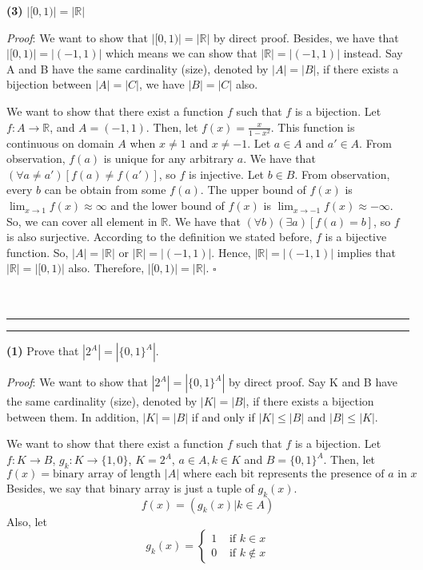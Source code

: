 \documentclass[a4paper, 11pt]{article}
\newcommand{\question}[2] {\vspace{.25in} \hrule\vspace{0.5em}
	\noindent{\bf #1: #2} \vspace{0.5em}
	\hrule \vspace{.10in}}
\renewcommand{\part}[1] {\vspace{.10in} {\bf (#1)}}
\begin{document}
	\part{3} $|[0,1)| = |\mathbb{R}|$

	{\em Proof}: We want to show that $|[0,1)| = |\mathbb{R}|$ by direct proof. Besides, we have that $|[0,1)| = |(-1,1)|$ which means we can show that $|\mathbb{R}| = |(-1,1)|$ instead. Say A and B have the same cardinality (size), denoted by $|A| = |B|$, if there exists a bijection between $|A| = |C|$, we have $|B| = |C|$ also.
	
	We want to show that there exist a function $f$ such that $f$ is a bijection. Let $f: A \rightarrow \mathbb{R}$, and $A = (-1,1)$. Then, let $f(x) = \frac{x}{1-x^2}$. This function is continuous on domain $A$ when $x \neq 1$ and $x \neq -1$. Let $a \in A$ and $a' \in A$. From observation, $f(a)$ is unique for any arbitrary $a$. We have that $ ( \forall a \neq a')[ f(a) \neq f(a')]$, so $f$ is injective. Let $b \in B$. From observation, every $b$ can be obtain from some $f(a)$. The upper bound of $f(x)$ is $\lim_{x \rightarrow 1} f(x) \approx \infty$ and the lower bound of $f(x)$ is $\lim_{x \rightarrow -1} f(x) \approx	 -\infty$. So, we can cover all element in $\mathbb{R}$.
	We have that $ ( \forall b)( \exists a)[ f(a) = b]$, so $f$ is also surjective. According to the definition we stated before, $f$ is a bijective function. So, $|A| = |\mathbb{R}|$ or $|\mathbb{R}| = |(-1,1)|$. Hence, $|\mathbb{R}| = |(-1,1)|$ implies that $|\mathbb{R}| = |[0,1)|$ also. Therefore, $|[0,1)| = |\mathbb{R}|$. $\square$\\\\\\
		
	\question{2}{The Power Set of A } %
	
	\part{1} Prove that $|2^A| = |\{0, 1\}^A|$.
	
	{\em Proof}: %
	We want to show that $|2^A| = |\{0, 1\}^A|$ by direct proof. Say K and B have the same cardinality (size), denoted by $|K| = |B|$, if there exists a bijection between them. In addition, $|K|=|B|$ if and only if $|K| \leq |B|$ and $|B| \leq |K|$. 
	
	We want to show that there exist a function $f$ such that $f$ is a bijection. Let $f:K \rightarrow B$, $g_k: K \rightarrow \{1,0\}$, $K = 2^A$, $a \in A, k \in K$ and $B = \{0, 1\}^A$. Then, let 
	$$f(x) =  \text{binary array of length $|A|$ where each bit represents the presence of $a$ in $x$}$$
	Besides, we say that binary array is just a tuple of $g_k(x)$.
	$$f(x) =  (g_k(x) | k \in A)$$
	Also, let 
	$$g_k(x) = \begin{cases} 
	1 & \text{ if $k \in x$} \\
	0 & \text{ if $k \notin x$}
	\end{cases} $$
	
\end{document}
